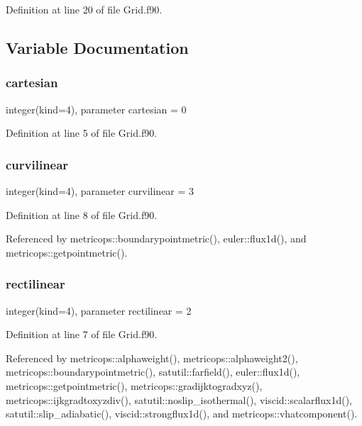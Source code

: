 Definition at line 20 of file Grid.\+f90.



\subsection{Variable Documentation}
\hypertarget{namespacegrid_a93002a1fdf205e858b27917e5ef07e87}{}\label{namespacegrid_a93002a1fdf205e858b27917e5ef07e87} 
\subsubsection{\texorpdfstring{cartesian}{cartesian}}
{\footnotesize\ttfamily integer(kind=4), parameter cartesian = 0}



Definition at line 5 of file Grid.\+f90.

\hypertarget{namespacegrid_a5e3aa0692b948da96fa11d90eb6c17ff}{}\label{namespacegrid_a5e3aa0692b948da96fa11d90eb6c17ff} 
\subsubsection{\texorpdfstring{curvilinear}{curvilinear}}
{\footnotesize\ttfamily integer(kind=4), parameter curvilinear = 3}



Definition at line 8 of file Grid.\+f90.



Referenced by metricops\+::boundarypointmetric(), euler\+::flux1d(), and metricops\+::getpointmetric().

\hypertarget{namespacegrid_a56b6da89996d538d28fc889ff68ce087}{}\label{namespacegrid_a56b6da89996d538d28fc889ff68ce087} 
\subsubsection{\texorpdfstring{rectilinear}{rectilinear}}
{\footnotesize\ttfamily integer(kind=4), parameter rectilinear = 2}



Definition at line 7 of file Grid.\+f90.



Referenced by metricops\+::alphaweight(), metricops\+::alphaweight2(), metricops\+::boundarypointmetric(), satutil\+::farfield(), euler\+::flux1d(), metricops\+::getpointmetric(), metricops\+::gradijktogradxyz(), metricops\+::ijkgradtoxyzdiv(), satutil\+::noslip\+\_\+isothermal(), viscid\+::scalarflux1d(), satutil\+::slip\+\_\+adiabatic(), viscid\+::strongflux1d(), and metricops\+::vhatcomponent().

